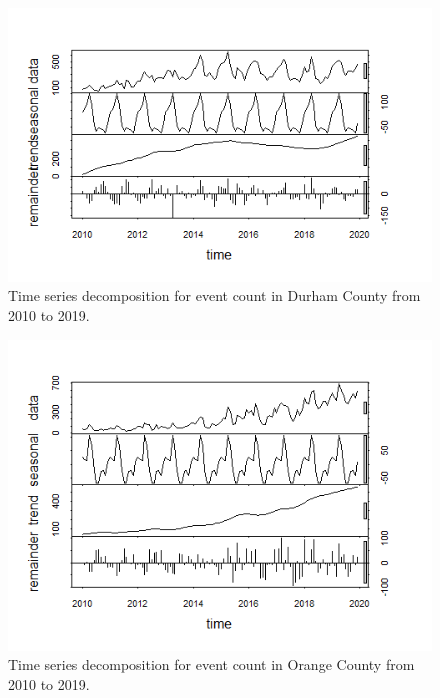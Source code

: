 \documentclass[
  12pt,
]{article}
\begin{document}
\begin{figure}
\centering
\includegraphics{./Output/Durham_event_ts_decomp.png}
\caption{Time series decomposition for event count in Durham County from
2010 to 2019.}
\end{figure}

\begin{figure}
\centering
\includegraphics{./Output/Orange_event_ts_decomp.png}
\caption{Time series decomposition for event count in Orange County from
2010 to 2019.}
\end{figure}
\end{document}
